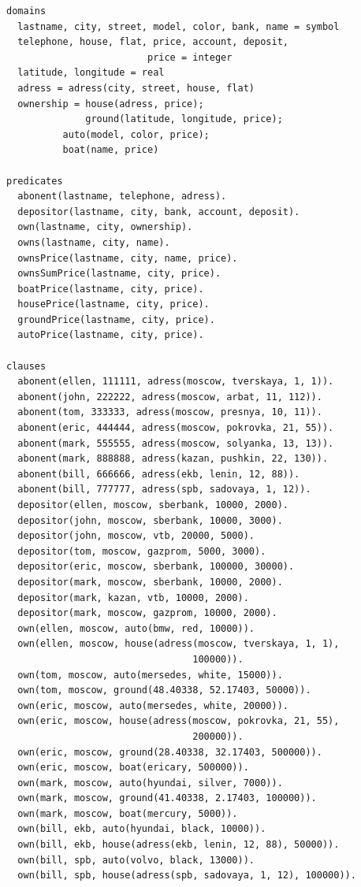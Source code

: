 \documentclass[a4paper,14pt]{extreport} %
\begin{document}
\begin{lstlisting}
domains
  lastname, city, street, model, color, bank, name = symbol
  telephone, house, flat, price, account, deposit, 
					     price = integer
  latitude, longitude = real
  adress = adress(city, street, house, flat)
  ownership = house(adress, price);
              ground(latitude, longitude, price);
	      auto(model, color, price);
	      boat(name, price)
        
predicates
  abonent(lastname, telephone, adress).
  depositor(lastname, city, bank, account, deposit).
  own(lastname, city, ownership).
  owns(lastname, city, name).
  ownsPrice(lastname, city, name, price).
  ownsSumPrice(lastname, city, price).
  boatPrice(lastname, city, price).
  housePrice(lastname, city, price).
  groundPrice(lastname, city, price).
  autoPrice(lastname, city, price).

clauses
  abonent(ellen, 111111, adress(moscow, tverskaya, 1, 1)).
  abonent(john, 222222, adress(moscow, arbat, 11, 112)).
  abonent(tom, 333333, adress(moscow, presnya, 10, 11)).
  abonent(eric, 444444, adress(moscow, pokrovka, 21, 55)).
  abonent(mark, 555555, adress(moscow, solyanka, 13, 13)).
  abonent(mark, 888888, adress(kazan, pushkin, 22, 130)).
  abonent(bill, 666666, adress(ekb, lenin, 12, 88)).
  abonent(bill, 777777, adress(spb, sadovaya, 1, 12)).
  depositor(ellen, moscow, sberbank, 10000, 2000).
  depositor(john, moscow, sberbank, 10000, 3000).
  depositor(john, moscow, vtb, 20000, 5000).
  depositor(tom, moscow, gazprom, 5000, 3000).
  depositor(eric, moscow, sberbank, 100000, 30000).
  depositor(mark, moscow, sberbank, 10000, 2000).
  depositor(mark, kazan, vtb, 10000, 2000).
  depositor(mark, moscow, gazprom, 10000, 2000).
  own(ellen, moscow, auto(bmw, red, 10000)).
  own(ellen, moscow, house(adress(moscow, tverskaya, 1, 1), 
					    	     100000)).
  own(tom, moscow, auto(mersedes, white, 15000)).
  own(tom, moscow, ground(48.40338, 52.17403, 50000)).
  own(eric, moscow, auto(mersedes, white, 20000)).
  own(eric, moscow, house(adress(moscow, pokrovka, 21, 55), 
					       	     200000)).
  own(eric, moscow, ground(28.40338, 32.17403, 500000)).
  own(eric, moscow, boat(ericary, 500000)).
  own(mark, moscow, auto(hyundai, silver, 7000)).
  own(mark, moscow, ground(41.40338, 2.17403, 100000)).
  own(mark, moscow, boat(mercury, 5000)).
  own(bill, ekb, auto(hyundai, black, 10000)).
  own(bill, ekb, house(adress(ekb, lenin, 12, 88), 50000)).
  own(bill, spb, auto(volvo, black, 13000)).
  own(bill, spb, house(adress(spb, sadovaya, 1, 12), 100000)).
  

\end{lstlisting}
\end{document}
